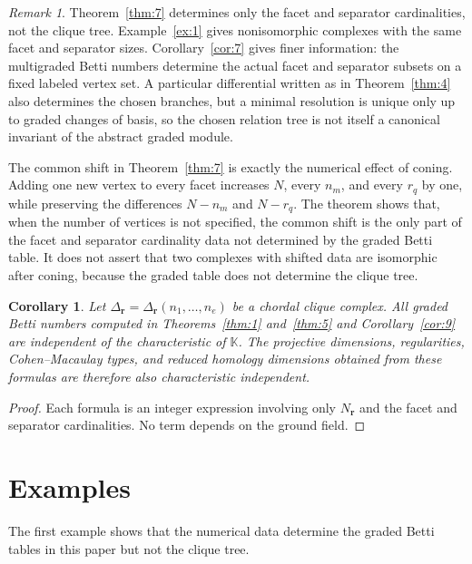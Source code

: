 \documentclass[11pt]{amsart}
\newtheorem{corollary}[theorem]{Corollary}
\theoremstyle{definition}
\theoremstyle{remark}
\newtheorem{remark}[theorem]{Remark}
\newcommand{\K}{\mathbb K}
\begin{document}
	\begin{remark}\label{rem:5}
		Theorem~\ref{thm:7} determines only the facet and separator cardinalities, not the clique tree. Example~\ref{ex:1} gives nonisomorphic complexes with the same facet and separator sizes. Corollary~\ref{cor:7} gives finer information: the multigraded Betti numbers determine the actual facet and separator subsets on a fixed labeled vertex set. A particular differential written as in Theorem~\ref{thm:4} also determines the chosen branches, but a minimal resolution is unique only up to graded changes of basis, so the chosen relation tree is not itself a canonical invariant of the abstract graded module.
		
		The common shift in Theorem~\ref{thm:7} is exactly the numerical effect of coning. Adding one new vertex to every facet increases $N$, every $n_m$, and every $r_q$ by one, while preserving the differences $N-n_m$ and $N-r_q$. The theorem shows that, when the number of vertices is not specified, the common shift is the only part of the facet and separator cardinality data not determined by the graded Betti table. It does not assert that two complexes with shifted data are isomorphic after coning, because the graded table does not determine the clique tree.
	\end{remark}
	
	\begin{corollary}\label{cor:17}
		Let $\Delta_{\mathbf r}=\Delta_{\mathbf r}(n_1,\ldots,n_e)$ be a chordal clique complex. All graded Betti numbers computed in Theorems~\ref{thm:1} and~\ref{thm:5} and Corollary~\ref{cor:9} are independent of the characteristic of $\K$. The projective dimensions, regularities, Cohen--Macaulay types, and reduced homology dimensions obtained from these formulas are therefore also characteristic independent.
	\end{corollary}
	
	\begin{proof}
		Each formula is an integer expression involving only $N_{\mathbf r}$ and the facet and separator cardinalities. No term depends on the ground field.
	\end{proof}
	
	\section{Examples}\label{sec:7}
	
	The first example shows that the numerical data determine the graded Betti tables in this paper but not the clique tree.
	
\end{document}
